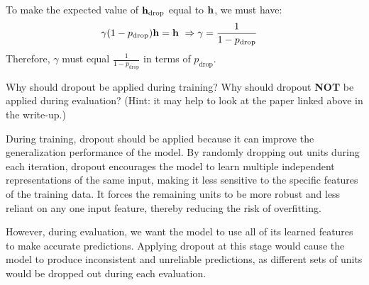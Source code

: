 \begin{parts}
\begin{subparts}
\begin{answer}
                To make the expected value of $\mathbf{h}_{\text{drop}}$ equal to $\mathbf{h}$, we must have:
                \begin{align*}
                \gamma (1-p_{\text{drop}}) \mathbf{h} &= \mathbf{h} \
                \Rightarrow \gamma = \frac{1}{1-p_{\text{drop}}}
                \end{align*}
                Therefore, $\gamma$ must equal $\frac{1}{1-p_{\text{drop}}}$ in terms of $p_{\text{drop}}$. 
                \end{answer} \newline
            
          \subpart[2] Why should dropout be applied during training? Why should dropout \textbf{NOT} be applied during evaluation? (Hint: it may help to look at the paper linked above in the write-up.) \newline

          \begin{answer}
          During training, dropout should be applied because it can improve the generalization performance of the model. By randomly dropping out units during each iteration, dropout encourages the model to learn multiple independent representations of the same input, making it less sensitive to the specific features of the training data. It forces the remaining units to be more robust and less reliant on any one input feature, thereby reducing the risk of overfitting.

            However, during evaluation, we want the model to use all of its learned features to make accurate predictions. Applying dropout at this stage would cause the model to produce inconsistent and unreliable predictions, as different sets of units would be dropped out during each evaluation.
          \end{answer} \newline
         
        \end{subparts}


\end{parts}
